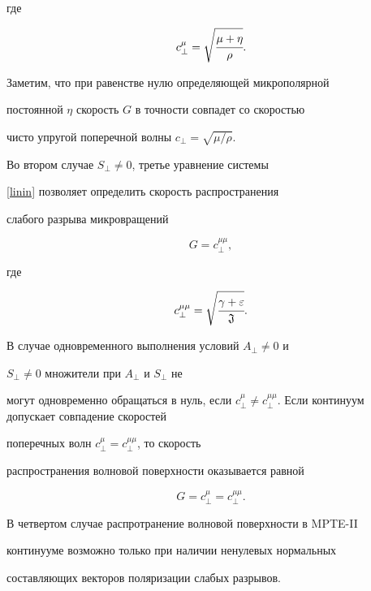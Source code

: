 где

$$

c^{\mu}_{\perp}=\sqrt{\cfrac{\mu + \eta}{\rho}}.

$$



Заметим, что при равенстве нулю определяющей микрополярной

постоянной $\eta$ скорость $G$ в точности совпадет со скоростью

чисто упругой поперечной волны $c_{\perp}=\sqrt{{\mu}/{\rho}}$.



Во втором случае $S_{\perp} \ne 0$, третье уравнение системы

\eqref{linin}  позволяет определить  скорость распространения

слабого разрыва микровращений

\begin{equation}

\label{G4}

G=c^{\mu \mu}_\perp,

\end{equation}

где

$$

c^{\mu \mu}_\perp=\sqrt{\cfrac{\gamma+

\varepsilon}{\mathfrak{J}}}.

$$



В случае одновременного выполнения условий $A_{\perp} \ne 0$ и

$S_{\perp} \ne 0$ множители при $A_{\perp} $ и $S_{\perp} $ не

могут одновременно обращаться в нуль, если $c^{\mu }_\perp \ne

c^{\mu \mu}_\perp$. Если континуум допускает совпадение скоростей

поперечных волн $c^{ \mu}_\perp = c^{\mu \mu}_\perp$, то скорость

распространения волновой поверхности оказывается равной

$$

G=c^{\mu }_\perp=c^{\mu \mu}_\perp.

$$



В четвертом случае распротранение волновой поверхности в MPTE-II

континууме возможно только при наличии ненулевых нормальных

составляющих векторов поляризации слабых разрывов.



